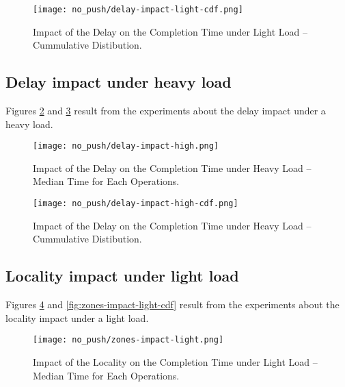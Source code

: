 \begin{figure}[h]
  \centering
  \centerline{\texttt{[image: no\_push/delay-impact-light-cdf.png]}}
  \caption{Impact of the Delay on the Completion Time under Light Load – Cummulative Distibution.}
  \label{fig:delay-impact-light-cdf}
\end{figure}


\subsection{Delay impact under heavy load}
Figures \ref{fig:delay-impact-high} and \ref{fig:delay-impact-high-cdf} result from the experiments about the delay impact under a heavy load.


\begin{figure}[h]
  \centering
  \centerline{\texttt{[image: no\_push/delay-impact-high.png]}}
  \caption{Impact of the Delay on the Completion Time under Heavy Load – Median Time for Each Operations.}
  \label{fig:delay-impact-high}
\end{figure}

\begin{figure}[h]
  \centering
  \centerline{\texttt{[image: no\_push/delay-impact-high-cdf.png]}}
  \caption{Impact of the Delay on the Completion Time under Heavy Load – Cummulative Distibution.}
  \label{fig:delay-impact-high-cdf}
\end{figure}

\subsection{Locality impact under light load}

Figures \ref{fig:zones-impact-light} and \ref{fig:zones-impact-light-cdf} result from the experiments about the locality impact under a light load.

\begin{figure}[h]
  \centering
  \centerline{\texttt{[image: no\_push/zones-impact-light.png]}}
  \caption{Impact of the Locality on the Completion Time under Light Load – Median Time for Each Operations.}
  \label{fig:zones-impact-light}
\end{figure}


